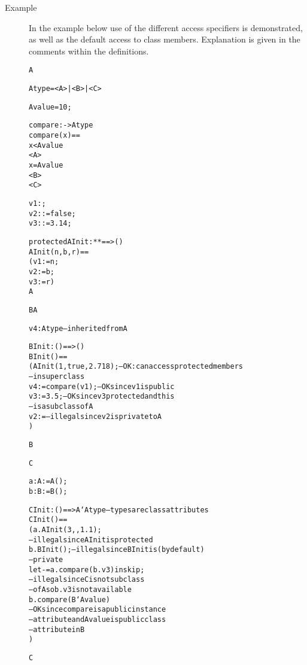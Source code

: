 \documentclass[\pformat,12pt]{article}
\begin{document}
\begin{description}
\item[Example] In the example below use of the different access
  specifiers is demonstrated, as well as the default access to class
  members. Explanation is given in the comments within the definitions.
\begin{alltt}
 A

    \PUBLIC Atype = <A> | <B> | <C>

    \PUBLIC Avalue = 10;

    \PUBLIC compare :  -> Atype
    compare(x) ==
       x < Avalue
       <A>
       x = Avalue
       <B>
       <C>
 
     v1: ;
     v2:  := false;
     v3:  := 3.14;

    protected AInit :  *  *  ==> ()
    AInit(n,b,r) ==
      (v1 := n;
       v2 := b;
       v3 := r)
 A

 B  A

    v4 : Atype --inherited from A


    BInit: () ==> ()
    BInit() ==
      (AInit(1,true,2.718); --OK: can access protected members
                            --in superclass
       v4 := compare(v1);   --OK since v1 is public
       v3 := 3.5;           --OK since v3 protected and this 
                            --is a subclass of A
       v2 :=    --illegal since v2 is private to A
      )

 B

 C

    a: A :=  A();
    b: B :=  B();



    CInit: () ==> A`Atype   --types are class attributes
    CInit() ==
      (a.AInit(3,,1.1);  
                            --illegal since AInit is protected
       b.BInit();           --illegal since BInit is (by default) 
                            --private
       let - = a.compare(b.v3) in skip;
                            --illegal since C is not subclass 
                            --of A so b.v3 is not available
        b.compare(B`Avalue)
                            --OK since compare is a public instance
                            --attribute and Avalue is public class
                            --attribute in B
      )

 C
\end{alltt}
  


\end{description}
\end{document}

